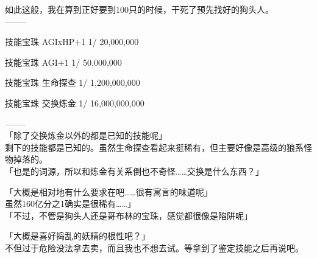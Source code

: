 如此这般，我在算到正好要到100只的时候，干死了预先找好的狗头人。\\

  --------

  技能宝珠  AGIxHP+1 1/     20,000,000

  技能宝珠     AGI+1 1/     50,000,000

  技能宝珠  生命探查 1/  1,200,000,000

  技能宝珠  交换炼金 1/ 16,000,000,000

  --------\\

「除了交换炼金以外的都是已知的技能呢」\\

剩下的技能都是已知的。虽然生命探查看起来挺稀有，但主要好像是高级的狼系怪物掉落的。\\

「也是的词源，所以和炼金有关系倒也不奇怪……交换是什么东西？」

「大概是相对地有什么要求在吧……很有寓言的味道呢」\\

虽然160亿分之1确实是很稀有……」\\

「不过，不管是狗头人还是哥布林的宝珠，感觉都很像是陷阱呢」

「大概是喜好捣乱的妖精的根性吧？」\\

不但过于危险没法拿去卖，而且我也不想去试。等拿到了鉴定技能之后再说吧。

